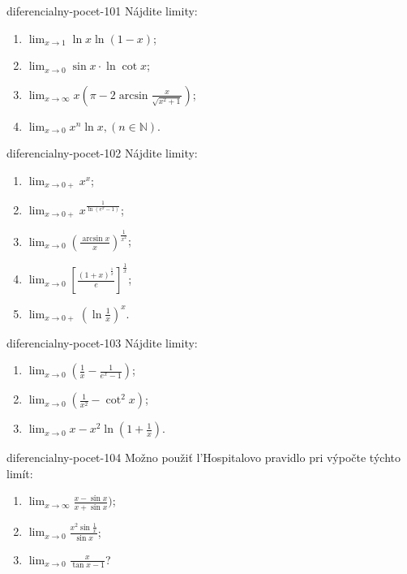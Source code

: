 \begin{defproblem}{diferencialny-pocet-101}
Nájdite limity:
\begin{multicols}{2}
\begin{enumerate}
    \item $\lim_{x\rightarrow 1}\ln x \ln (1-x)$;
	\item $\lim_{x\rightarrow 0}\sin x\cdot\ln \cot x$;
	\item $\lim_{x\rightarrow \infty}x(\pi-2\arcsin\frac{x}{\sqrt{x^2+1}})$;
	\item $\lim_{x\rightarrow 0}x^n\ln x,(n\in\mathbb{N})$.
\end{enumerate}
\end{multicols}
\end{defproblem}

\begin{defproblem}{diferencialny-pocet-102}
Nájdite limity:
\begin{multicols}{2}
\begin{enumerate}
    \item $\lim_{x\rightarrow 0+}x^x$;
	\item $\lim_{x\rightarrow 0+}x^{\frac{1}{\ln (e^x-1)}}$;
	\item $\lim_{x\rightarrow 0}(\frac{\arcsin x}{x})^{\frac{1}{x^2}}$;
	\item $\lim_{x\rightarrow 0}[\frac{(1+x)^{\frac{1}{x}}}{e}]^{\frac{1}{x}}$;
	\item $\lim_{x\rightarrow 0+}(\ln \frac{1}{x})^x$.
\end{enumerate}
\end{multicols}
\end{defproblem}

\begin{defproblem}{diferencialny-pocet-103}
Nájdite limity:
\begin{multicols}{2}
\begin{enumerate}
    \item $\lim_{x\rightarrow 0}(\frac{1}{x}-\frac{1}{e^x-1})$;
	\item $\lim_{x\rightarrow 0}(\frac{1}{x^2}-\cot^2 x)$;
	\item $\lim_{x\rightarrow 0}x-x^2\ln (1+\frac{1}{x})$.
\end{enumerate}
\end{multicols}
\end{defproblem}

\begin{defproblem}{diferencialny-pocet-104}
Možno použiť l'Hospitalovo pravidlo pri výpočte týchto limít:
\begin{multicols}{2}
\begin{enumerate}
    \item $\lim_{x\rightarrow \infty}\frac{x-\sin x}{x+\sin x})$;
	\item $\lim_{x\rightarrow 0}\frac{x^2\sin \frac{1}{x}}{\sin x}$;
	\item $\lim_{x\rightarrow 0}\frac{x}{\tan x -1}$?
\end{enumerate}
\end{multicols}
\end{defproblem}

